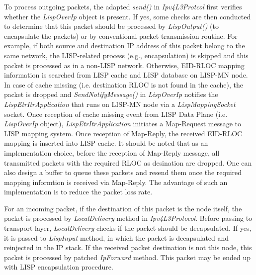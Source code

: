 To process outgoing packets, the adapted \emph{send()} in \emph{Ipv4L3Protcol} first verifies whether the \emph{LispOverIp} object is present. If yes, some checks are then conducted to determine that this packet should be processed by \emph{LispOutput()} (to encapsulate the packets) or by conventional packet transmission routine. For example, if both source and destination IP address of this packet belong to the same network, the LISP-related process (e.g., encapsulation) is skipped and this packet is processed as in a non-LISP network. Otherwise, EID-RLOC mapping information is searched from LISP cache and LISP database on LISP-MN node. In case of cache missing (i.e. destination RLOC is not found in the cache), the packet is dropped and \emph{SendNotifyMessage()} in \emph{LispOverIp} notifies the \emph{LispEtrItrApplication} that runs on LISP-MN node via a \emph{LispMappingSocket} socket. Once reception of cache missing event from LISP Data Plane (i.e. \emph{LispOverIp} object), \emph{LispEtrItrApplication} initiates a Map-Request message to LISP mapping system. Once reception of Map-Reply, the received EID-RLOC mapping is inserted into LISP cache. It should be noted that as an implementation choice, before the reception of Map-Reply message, all transmitted packets with the required RLOC as desination are dropped. One can also design a buffer to queue these packets and resend them once the required mapping informtion is received via Map-Reply. The advantage of such an implementation is to reduce the packet loss rate. 

For an incoming packet, if the destination of this packet is the node itself, the packet is processed by \emph{LocalDelivery} method in \emph{Ipv4L3Protocol}. Before passing to transport layer, \emph{LocalDelivery} checks if the packet should be decapsulated. If yes, it is passed to \emph{LispInput} method, in which the packet is decapsulated and reinjected in the IP stack. If the received packet destination is not this node, this packet is processed by patched \emph{IpForward} method. This packet may be ended up with LISP encapsulation procedure.

